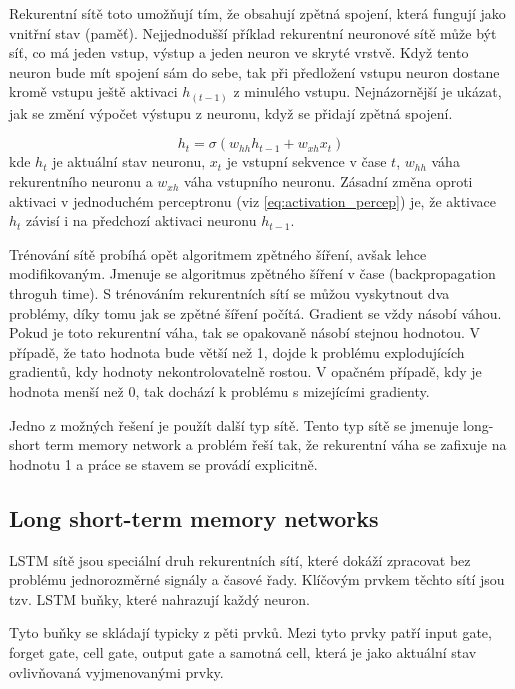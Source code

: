 \documentclass[FM,BP,fonts]{tulthesis}
\begin{document}
Rekurentní sítě toto umožňují tím, že obsahují zpětná spojení, která fungují jako vnitřní stav (paměť). Nejjednodušší příklad rekurentní neuronové sítě může být síť, co má jeden vstup, výstup a jeden neuron ve skryté vrstvě. Když tento neuron bude mít spojení sám do sebe, tak při předložení vstupu neuron dostane kromě vstupu ještě aktivaci $h_{(t-1)}$ z minulého vstupu. Nejnázornější je ukázat, jak se změní výpočet výstupu z neuronu, když se přidají zpětná spojení.


\begin{equation}
	h_t = \sigma(w_{hh}h_{t-1} + w_{xh}x_t)
\end{equation}
kde $h_t$ je aktuální stav neuronu, $x_t$ je vstupní sekvence v čase $t$, $w_{hh}$ váha rekurentního neuronu a $w_{xh}$ váha vstupního neuronu. Zásadní změna oproti aktivaci v jednoduchém perceptronu (viz \ref{eq:activation_percep})  je, že aktivace $h_t$ závisí i na předchozí aktivaci neuronu $h_{t-1}$.

Trénování sítě probíhá opět algoritmem zpětného šíření, avšak lehce modifikovaným. Jmenuje se algoritmus zpětného šíření v čase (backpropagation throguh time). S trénováním rekurentních sítí se můžou vyskytnout dva problémy, díky tomu jak se zpětné šíření počítá. \cite{martinpilatRNN} Gradient se vždy násobí váhou. Pokud je toto rekurentní váha, tak se opakovaně násobí stejnou hodnotou. V případě, že tato hodnota bude větší než 1, dojde k problému explodujících gradientů, kdy hodnoty nekontrolovatelně rostou. V opačném případě, kdy je hodnota menší než 0, tak dochází k problému s mizejícími gradienty.

Jedno z možných řešení je použít další typ sítě. Tento typ sítě se jmenuje long-short term memory network a problém řeší tak, že rekurentní váha se zafixuje na hodnotu 1 a práce se stavem se provádí explicitně.



\subsection{Long short-term memory networks}\label{nn-lstm}
LSTM sítě jsou speciální druh rekurentních sítí, které dokáží zpracovat  bez problému jednorozměrné signály a časové řady. Klíčovým prvkem těchto sítí jsou tzv. LSTM buňky, které nahrazují každý neuron. 

Tyto buňky se skládají typicky z pěti prvků. Mezi tyto prvky patří input gate, forget gate, cell gate, output gate a samotná cell, která je jako aktuální stav ovlivňovaná vyjmenovanými prvky.
\end{document}
